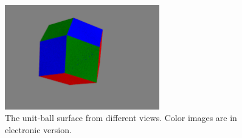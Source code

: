 \documentclass{article}
\begin{document}
\begin{figure}
\includegraphics[width=0.6\textwidth]{figure4}
\centering
\caption{The unit-ball surface from different views. Color images are in electronic version.}
\end{figure} 
\end{document}
